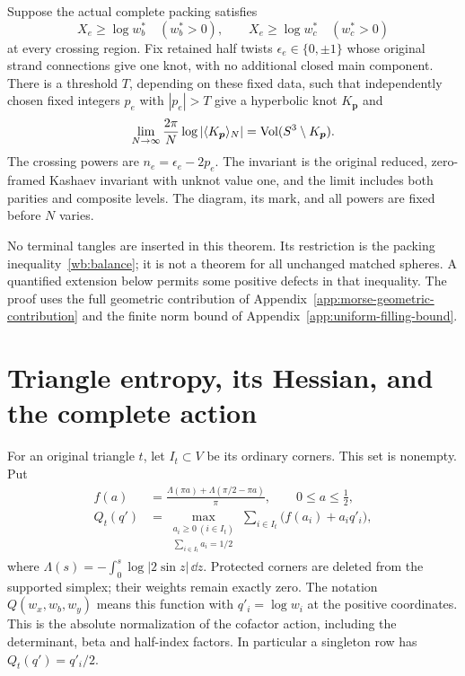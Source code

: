 \begin{theorem}\label{wb:volume}
Suppose the actual complete packing satisfies
\begin{equation}\label{wb:balance}
 X_e\ge\log w_b^*\quad(w_b^*>0),\qquad
 X_e\ge\log w_c^*\quad(w_c^*>0)
\end{equation}
at every crossing region. Fix retained half twists
$\epsilon_e\in\{0,\pm1\}$ whose original strand connections give
one knot, with no additional closed main component. There is a
threshold $T$, depending on these fixed data, such that independently
chosen fixed integers $p_e$ with $|p_e|>T$ give a hyperbolic knot
$K_{\boldsymbol p}$ and
\[
 \lim_{N\to\infty}\frac{2\pi}{N}
       \log|\langle K_{\boldsymbol p}\rangle_N|
       =\operatorname{Vol}(S^3\setminus K_{\boldsymbol p}).
\]
The crossing powers are $n_e=\epsilon_e-2p_e$. The invariant is the
original reduced, zero-framed Kashaev invariant with unknot value one,
and the limit includes both parities and composite levels. The
diagram, its mark, and all powers are fixed before $N$ varies.
\end{theorem}

No terminal tangles are inserted in this theorem. Its restriction is
the packing inequality~\eqref{wb:balance}; it is not a theorem for all
unchanged matched spheres. A quantified extension below permits some
positive defects in that inequality. The proof uses the full geometric
contribution of Appendix~\ref{app:morse-geometric-contribution} and the
finite norm bound of Appendix~\ref{app:uniform-filling-bound}.

\section{Triangle entropy, its Hessian, and the complete action}

For an original triangle $t$, let $I_t\subset V$ be its ordinary
corners. This set is nonempty. Put
\begin{equation}\label{wb:triangle}
\begin{split}
 f(a)&=\frac{\Lambda(\pi a)+\Lambda(\pi/2-\pi a)}{\pi},
       \qquad 0\le a\le\tfrac12,\\
 Q_t(q')&=\max_{\substack{a_i\ge0\ (i\in I_t)\\
                         \sum_{i\in I_t}a_i=1/2}}
               \sum_{i\in I_t}\bigl(f(a_i)+a_iq'_i\bigr),
\end{split}
\end{equation}
where $\Lambda(s)=-\int_0^s\log|2\sin z|\,\dd z$.
Protected corners are deleted from the supported simplex; their weights
remain exactly zero. The notation $Q(w_x,w_b,w_y)$ means this function
with $q'_i=\log w_i$ at the positive coordinates. This is the absolute
normalization of the cofactor action, including the determinant, beta
and half-index factors. In particular a singleton row has
$Q_t(q')=q'_i/2$.

